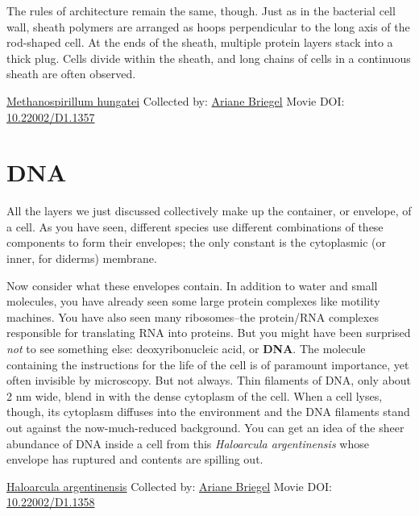 \documentclass[]{tufte-book}
\begin{document}
The rules of architecture remain the same, though. Just as in the bacterial cell wall, sheath polymers are arranged as hoops perpendicular to the long axis of the rod-shaped cell. At the ends of the sheath, multiple protein layers stack into a thick plug. Cells divide within the sheath, and long chains of cells in a continuous sheath are often observed.



\hypertarget{htmlwidget-529884696450b11e9820}{}

\label{fig:2-8}\protect\hyperlink{tree}{Methanospirillum hungatei} Collected by: \protect\hyperlink{ariane_briegel}{Ariane Briegel} Movie DOI: \href{https://doi.org/10.22002/D1.1357}{10.22002/D1.1357}

\hypertarget{dna}{%
\section{DNA}\label{dna}}

All the layers we just discussed collectively make up the container, or envelope, of a cell. As you have seen, different species use different combinations of these components to form their envelopes; the only constant is the cytoplasmic (or inner, for diderms) membrane.

Now consider what these envelopes contain. In addition to water and small molecules, you have already seen some large protein complexes like motility machines. You have also seen many ribosomes--the protein/RNA complexes responsible for translating RNA into proteins. But you might have been surprised \emph{not} to see something else: deoxyribonucleic acid, or \textbf{DNA}. The molecule containing the instructions for the life of the cell is of paramount importance, yet often invisible by microscopy. But not always. Thin filaments of DNA, only about 2 nm wide, blend in with the dense cytoplasm of the cell. When a cell lyses, though, its cytoplasm diffuses into the environment and the DNA filaments stand out against the now-much-reduced background. You can get an idea of the sheer abundance of DNA inside a cell from this \emph{Haloarcula argentinensis} whose envelope has ruptured and contents are spilling out.



\hypertarget{htmlwidget-99182d366f8aad250810}{}

\label{fig:2-9}\protect\hyperlink{tree}{Haloarcula argentinensis} Collected by: \protect\hyperlink{ariane_briegel}{Ariane Briegel} Movie DOI: \href{https://doi.org/10.22002/D1.1358}{10.22002/D1.1358}
\end{document}
